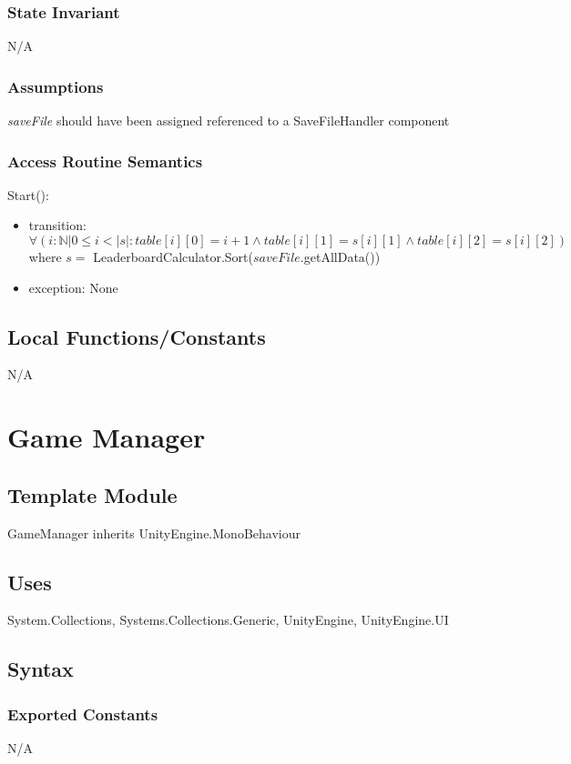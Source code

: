 \documentclass[12pt]{article}
\begin{document}
\subsubsection {State Invariant}
N/A
\subsubsection {Assumptions}
\textit{saveFile} should have been assigned referenced to a SaveFileHandler component
\subsubsection {Access Routine Semantics}

\noindent Start():
\begin{itemize}
	\item transition: \\
	$\forall(i: \mathbb{N}| 0 \le i < |s|:table[i][0]=i+1 \land table[i][1]=s[i][1] \land  table[i][2]=s[i][2])$\\ 
	where $s=$ LeaderboardCalculator.Sort($saveFile.$getAllData())
	\item exception: None
\end{itemize}

\subsection{Local Functions/Constants}
N/A

\newpage

\section{Game Manager}

\subsection{Template Module}
GameManager inherits UnityEngine.MonoBehaviour

\subsection{Uses}
System.Collections, Systems.Collections.Generic, UnityEngine, UnityEngine.UI

\subsection{Syntax}
\subsubsection{Exported Constants}
N/A
\end{document}
